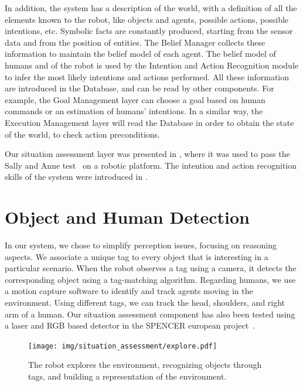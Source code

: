 In addition, the system has a description of the world, with a definition of all the elements known to the robot, like objects and agents, possible actions, possible intentions, etc. 
Symbolic facts are constantly produced, starting from the sensor data and from the position of entities. The Belief Manager collects these information to maintain the belief model of each agent. The belief model of humans and of the robot is used by the Intention and Action Recognition module to infer the most likely intentions and actions performed. All these information are introduced in the Database, and can be read by other components. For example, the Goal Management layer can choose a goal based on human commands or an estimation of humans' intentions. In a similar way, the Execution Management layer will read the Database in order to obtain the state of the world, to check action preconditions.  

Our situation assessment layer was presented in \cite{Milliez2014}, where it was used to pass the Sally and Anne test~\cite{Baron1985} on a robotic platform. The intention and action recognition skills of the system were introduced in \cite{devin2016some}.

\section{Object and Human Detection}
\label{sec:situation_assessment-object_human_detection}
In our system, we chose to simplify perception issues, focusing on reasoning aspects. We associate a unique tag to every object that is interesting in a particular scenario.  When the robot observes a tag using a camera, it detects the corresponding object using a tag-matching algorithm.
Regarding humans, we use a motion capture software to identify and track agents moving in the environment. Using different tags, we can track the head, shoulders, and right arm of a human. Our situation assessment component has also been tested using a laser and RGB based detector in the SPENCER european project~\cite{lindermulti}.


 \begin{figure}[ht!]
	\centering
	\texttt{[image: img/situation\_assessment/explore.pdf]}
	\caption[The robot builds a representation of the environment]{The robot explores the environment, recognizing objects through tags, and building a representation of the environment.}
	\label{fig:situation_assessment-explore}
\end{figure}


